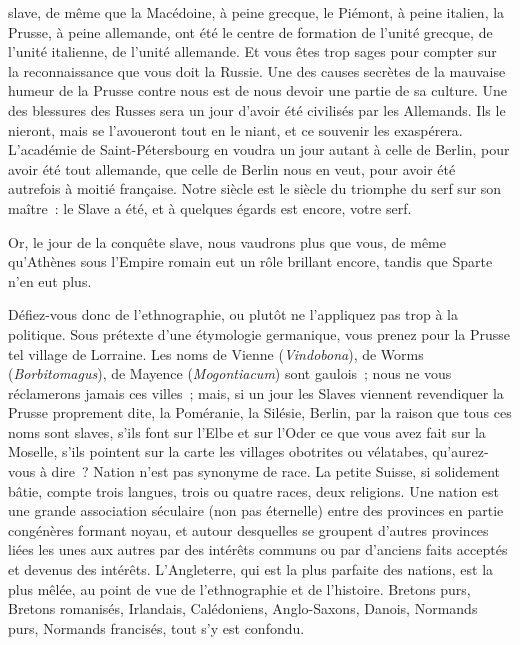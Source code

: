 \documentclass[french,twoside]{book} %
\begin{document}
slave, de même que la Macédoine, à peine grecque, le Piémont, à peine italien, la Prusse, à peine allemande, ont été le centre de formation de l’unité grecque, de l’unité italienne, de l’unité allemande. Et vous êtes trop sages pour compter sur la reconnaissance que vous doit la Russie. Une des causes secrètes de la mauvaise humeur de la Prusse contre nous est de nous devoir une partie de sa culture. Une des blessures des Russes sera un jour d’avoir été civilisés par les Allemands. Ils le nieront, mais se l’avoueront tout en le niant, et ce souvenir les exaspérera. L’académie de Saint-Pétersbourg en voudra un jour autant à celle de Berlin, pour avoir été tout allemande, que celle de Berlin nous en veut, pour avoir été autrefois à moitié française. Notre siècle est le siècle du triomphe du serf sur son maître : le Slave a été, et à quelques égards est encore, votre serf.\par
Or, le jour de la conquête slave, nous vaudrons plus que vous, de même qu’Athènes sous l’Empire romain eut un rôle brillant encore, tandis que Sparte n’en eut plus.\par
Défiez-vous donc de l’ethnographie, ou plutôt ne l’appliquez pas trop à la politique. Sous prétexte d’une étymologie germanique, vous prenez pour la Prusse tel village de Lorraine. Les noms de Vienne ({\itshape Vindobona}), de Worms ({\itshape Borbitomagus}), de Mayence ({\itshape Mogontiacum}) sont gaulois ; nous ne vous réclamerons jamais ces villes ; mais, si un jour les Slaves viennent revendiquer la Prusse proprement dite, la Poméranie, la Silésie, Berlin, par la raison que tous ces noms sont slaves, s’ils font sur l’Elbe et sur l’Oder ce que vous avez fait sur la Moselle, s’ils pointent sur la carte les villages obotrites ou vélatabes, qu’aurez-vous à dire ? Nation n’est pas synonyme de race. La petite Suisse, si solidement bâtie, compte trois langues, trois ou quatre races, deux religions. Une nation est une grande association séculaire (non pas éternelle) entre des provinces en partie congénères formant noyau, et autour desquelles se groupent d’autres provinces liées les unes aux autres par des intérêts communs ou par d’anciens faits acceptés et devenus des intérêts. L’Angleterre, qui est la plus parfaite des nations, est la plus mêlée, au point de vue de l’ethnographie et de l’histoire. Bretons purs, Bretons romanisés, Irlandais, Calédoniens, Anglo-Saxons, Danois, Normands purs, Normands francisés, tout s’y est confondu.\par
\end{document}
